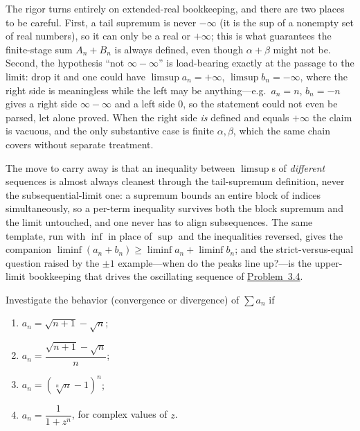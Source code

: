 \documentclass[main.tex]{subfiles}
\begin{document}
\begin{Reflection}
The rigor turns entirely on extended-real bookkeeping, and there are two places to be careful. First, a
tail supremum is never $-\infty$ (it is the sup of a nonempty set of real numbers), so it can only be a
real or $+\infty$; this is what guarantees the finite-stage sum $A_n+B_n$ is always defined, even though
$\alpha+\beta$ might not be. Second, the hypothesis ``not $\infty-\infty$'' is load-bearing exactly at
the passage to the limit: drop it and one could have $\limsup a_n=+\infty$, $\limsup b_n=-\infty$, where
the right side is meaningless while the left may be anything---e.g.\ $a_n=n$, $b_n=-n$ gives a right side
$\infty-\infty$ and a left side $0$, so the statement could not even be parsed, let alone proved. When
the right side \emph{is} defined and equals $+\infty$ the claim is vacuous, and the only substantive case
is finite $\alpha,\beta$, which the same chain covers without separate treatment.

The move to carry away is that an inequality between $\limsup$s of \emph{different} sequences is almost
always cleanest through the tail-supremum definition, never the subsequential-limit one: a supremum bounds
an entire block of indices simultaneously, so a per-term inequality survives both the block supremum and
the limit untouched, and one never has to align subsequences. The same template, run with $\inf$ in place
of $\sup$ and the inequalities reversed, gives the companion $\liminf(a_n+b_n)\ge\liminf a_n+\liminf b_n$;
and the strict-versus-equal question raised by the $\pm1$ example---when do the peaks line up?---is the
upper-limit bookkeeping that drives the oscillating sequence of \hyperlink{prob:3.4}{Problem~3.4}.
\end{Reflection}

Investigate the behavior (convergence or divergence) of $\sum a_{n}$ if
\begin{enumerate}
  \item $a_{n} = \sqrt{n+1} - \sqrt{n}$;
  \item $a_{n} = \dfrac{\sqrt{n+1} - \sqrt{n}}{n}$;
  \item $a_{n} = (\sqrt[n]{n} - 1)^{n}$;
  \item $a_{n} = \dfrac{1}{1 + z^{n}}$, \quad for complex values of $z$.
\end{enumerate}
\end{document}
